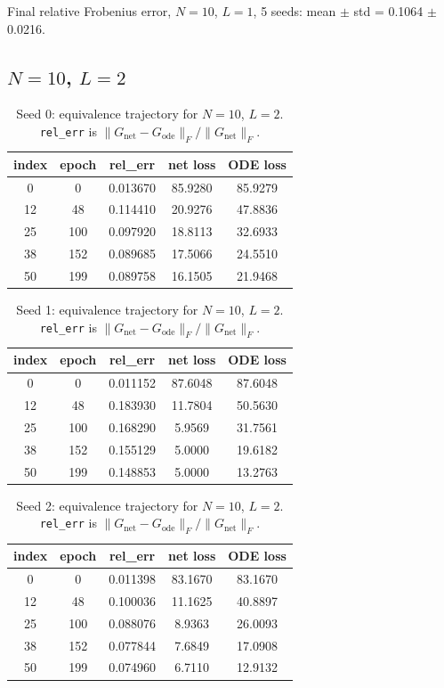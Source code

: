 Final relative Frobenius error, $N=10$, $L=1$, 5 seeds: mean $\pm$ std = 0.1064 $\pm$ 0.0216.

\subsection{$N=10$, $L=2$}
\begin{table}[H]
\centering
\caption{Seed 0: equivalence trajectory for $N=10$, $L=2$. \texttt{rel\_err} is $\|G_{\mathrm{net}} - G_{\mathrm{ode}}\|_F / \|G_{\mathrm{net}}\|_F$.}
\label{tab:equiv-N10-L2-s0}
\begin{tabular}{c c c c c}
\toprule
index & epoch & rel\_err & net loss & ODE loss \\
\midrule
0 & 0 & 0.013670 & 85.9280 & 85.9279 \\
12 & 48 & 0.114410 & 20.9276 & 47.8836 \\
25 & 100 & 0.097920 & 18.8113 & 32.6933 \\
38 & 152 & 0.089685 & 17.5066 & 24.5510 \\
50 & 199 & 0.089758 & 16.1505 & 21.9468 \\
\bottomrule
\end{tabular}
\end{table}

\begin{table}[H]
\centering
\caption{Seed 1: equivalence trajectory for $N=10$, $L=2$. \texttt{rel\_err} is $\|G_{\mathrm{net}} - G_{\mathrm{ode}}\|_F / \|G_{\mathrm{net}}\|_F$.}
\label{tab:equiv-N10-L2-s1}
\begin{tabular}{c c c c c}
\toprule
index & epoch & rel\_err & net loss & ODE loss \\
\midrule
0 & 0 & 0.011152 & 87.6048 & 87.6048 \\
12 & 48 & 0.183930 & 11.7804 & 50.5630 \\
25 & 100 & 0.168290 & 5.9569 & 31.7561 \\
38 & 152 & 0.155129 & 5.0000 & 19.6182 \\
50 & 199 & 0.148853 & 5.0000 & 13.2763 \\
\bottomrule
\end{tabular}
\end{table}

\begin{table}[H]
\centering
\caption{Seed 2: equivalence trajectory for $N=10$, $L=2$. \texttt{rel\_err} is $\|G_{\mathrm{net}} - G_{\mathrm{ode}}\|_F / \|G_{\mathrm{net}}\|_F$.}
\label{tab:equiv-N10-L2-s2}
\begin{tabular}{c c c c c}
\toprule
index & epoch & rel\_err & net loss & ODE loss \\
\midrule
0 & 0 & 0.011398 & 83.1670 & 83.1670 \\
12 & 48 & 0.100036 & 11.1625 & 40.8897 \\
25 & 100 & 0.088076 & 8.9363 & 26.0093 \\
38 & 152 & 0.077844 & 7.6849 & 17.0908 \\
50 & 199 & 0.074960 & 6.7110 & 12.9132 \\
\bottomrule
\end{tabular}
\end{table}

